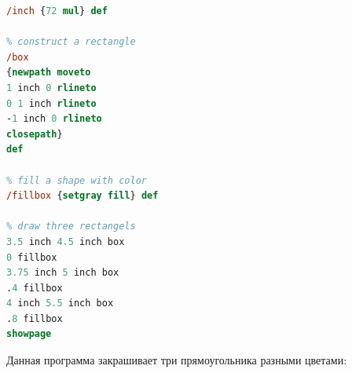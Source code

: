 \begin{lstlisting}[label=PostScript-example,caption=Простая программа на языке PostScript, language = PostScript]
% transform inches to pixels
/inch {72 mul} def

% construct a rectangle
/box        
{newpath moveto
1 inch 0 rlineto
0 1 inch rlineto
-1 inch 0 rlineto
closepath} 
def

% fill a shape with color
/fillbox {setgray fill} def

% draw three rectangels
3.5 inch 4.5 inch box
0 fillbox
3.75 inch 5 inch box
.4 fillbox
4 inch 5.5 inch box
.8 fillbox
showpage
\end{lstlisting}

Данная программа закрашивает три прямоугольника разными цветами: 


